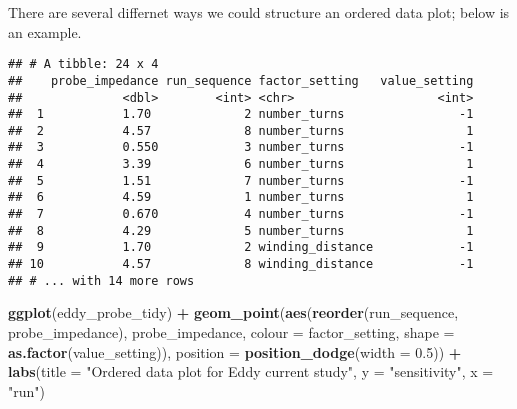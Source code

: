 \documentclass[]{book}
\newenvironment{Shaded}{\begin{snugshade}}{\end{snugshade}}
\newcommand{\DataTypeTok}[1]{\textcolor[rgb]{0.13,0.29,0.53}{#1}}
\newcommand{\FloatTok}[1]{\textcolor[rgb]{0.00,0.00,0.81}{#1}}
\newcommand{\KeywordTok}[1]{\textcolor[rgb]{0.13,0.29,0.53}{\textbf{#1}}}
\newcommand{\NormalTok}[1]{#1}
\newcommand{\OperatorTok}[1]{\textcolor[rgb]{0.81,0.36,0.00}{\textbf{#1}}}
\newcommand{\StringTok}[1]{\textcolor[rgb]{0.31,0.60,0.02}{#1}}
\theoremstyle{definition}
\theoremstyle{definition}
\theoremstyle{definition}
\theoremstyle{remark}
\begin{document}
There are several differnet ways we could structure an ordered data
plot; below is an example.

\begin{Shaded}
\end{Shaded}

\begin{verbatim}
## # A tibble: 24 x 4
##    probe_impedance run_sequence factor_setting   value_setting
##              <dbl>        <int> <chr>                    <int>
##  1           1.70             2 number_turns                -1
##  2           4.57             8 number_turns                 1
##  3           0.550            3 number_turns                -1
##  4           3.39             6 number_turns                 1
##  5           1.51             7 number_turns                -1
##  6           4.59             1 number_turns                 1
##  7           0.670            4 number_turns                -1
##  8           4.29             5 number_turns                 1
##  9           1.70             2 winding_distance            -1
## 10           4.57             8 winding_distance            -1
## # ... with 14 more rows
\end{verbatim}

\begin{Shaded}
\begin{Highlighting}[]
\KeywordTok{ggplot}\NormalTok{(eddy_probe_tidy) }\OperatorTok{+}
\StringTok{  }\KeywordTok{geom_point}\NormalTok{(}\KeywordTok{aes}\NormalTok{(}\KeywordTok{reorder}\NormalTok{(run_sequence, probe_impedance), probe_impedance, }\DataTypeTok{colour =}\NormalTok{ factor_setting, }\DataTypeTok{shape =} \KeywordTok{as.factor}\NormalTok{(value_setting)), }\DataTypeTok{position =} \KeywordTok{position_dodge}\NormalTok{(}\DataTypeTok{width =} \FloatTok{0.5}\NormalTok{)) }\OperatorTok{+}
\StringTok{  }\KeywordTok{labs}\NormalTok{(}\DataTypeTok{title =} \StringTok{"Ordered data plot for Eddy current study"}\NormalTok{, }\DataTypeTok{y =} \StringTok{"sensitivity"}\NormalTok{, }\DataTypeTok{x =} \StringTok{"run"}\NormalTok{)}
\end{Highlighting}
\end{Shaded}
\end{document}
